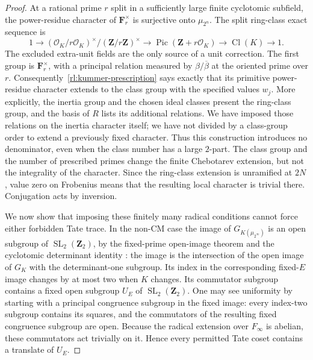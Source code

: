 \begin{proof}
At a rational prime $r$ split in a sufficiently large finite cyclotomic
subfield, the power-residue character of $\mathbf F_r^\times$ is
surjective onto $\mu_{2^n}$.  The split ring-class exact sequence is
\[
 1\longrightarrow
  (\mathcal O_K/r\mathcal O_K)^\times/(\mathbf Z/r\mathbf Z)^\times
 \longrightarrow\operatorname{Pic}(\mathbf Z+r\mathcal O_K)
 \longrightarrow\operatorname{Cl}(K)\longrightarrow1.
\]
The excluded extra-unit fields are the only source of a unit
correction.  The first group is $\mathbf F_r^\times$, with a principal
relation measured by $\beta/\overline\beta$ at the oriented prime over
$r$.  Consequently~\eqref{rl:kummer-prescription} says exactly that its
primitive power-residue character extends to the class group with the
specified values $w_j$.  More explicitly, the inertia group and the
chosen ideal classes present the ring-class group, and the basis of $R$
lists its additional relations.  We have imposed those relations on the
inertia character itself; we have not divided by a class-group order
to extend a previously fixed character.  Thus this construction introduces
no denominator, even when the class number has a large $2$-part.  The
class group and the number of prescribed primes change the finite
Chebotarev extension, but not the integrality of the character.
Since the ring-class extension is unramified at $2N$, value zero on
Frobenius means that the resulting local character is trivial there.
Conjugation acts by inversion.

We now show that imposing these finitely many radical conditions cannot
force either forbidden Tate trace.  In the non-CM case the image of
$G_{K(\mu_{2^\infty})}$ is an open subgroup of
$\operatorname{SL}_2(\mathbf Z_2)$, by the fixed-prime open-image theorem
and the cyclotomic determinant identity
\cite[Chapter~IV, \S2.2, theorem, p.~IV-11, and Chapter~I, \S1.2,
Example~2, p.~I-4]{Serre1968}: the image is the intersection of the
open image of $G_K$ with the determinant-one subgroup.
Its index in the corresponding fixed-$E$ image changes
by at most two when $K$ changes.  Its commutator subgroup contains a
fixed open subgroup $U_E$ of $\operatorname{SL}_2(\mathbf Z_2)$.
One may see uniformity by starting with a principal congruence subgroup
in the fixed image: every index-two subgroup contains its squares, and
the commutators of the resulting fixed congruence subgroup are open.
Because the radical extension over $F_\infty$ is abelian, these
commutators act trivially on it.  Hence every permitted Tate coset
contains a translate of $U_E$.


\end{proof}
